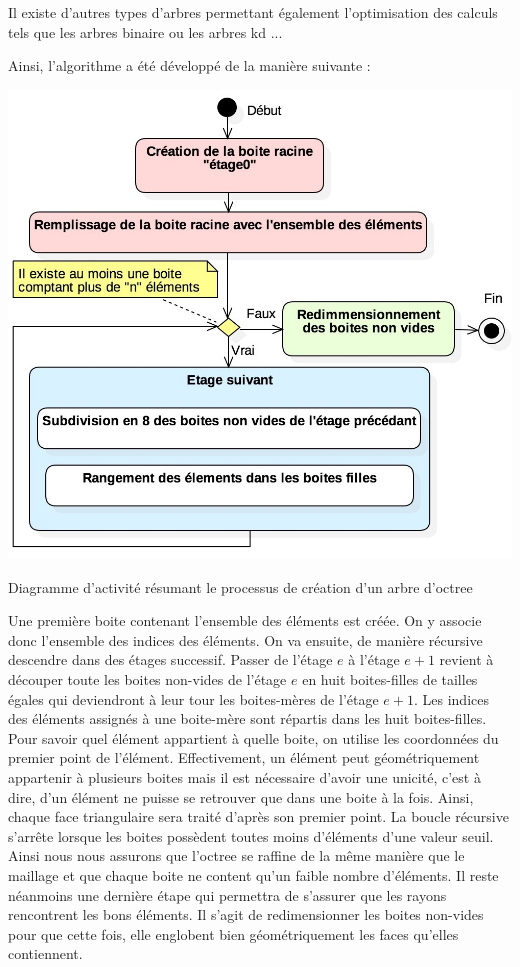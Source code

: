 Il existe d'autres types d'arbres permettant également l'optimisation des calculs tels que les arbres binaire ou les arbres kd ...

Ainsi, l'algorithme a été développé de la manière suivante :

\begin{figureth}
	\includegraphics[width=0.8\linewidth]{images/DiagOctree}
	\caption{Diagramme d'activité résumant le processus de création d'un arbre d'octree}
	\label{DiagOctree}
\end{figureth}

Une première boite contenant l'ensemble des éléments est créée. On y associe donc l'ensemble des indices des éléments. On va ensuite, de manière récursive descendre dans des étages successif. Passer de l'étage $e$ à l'étage $e+1$ revient à découper toute les boites non-vides de l'étage $e$ en huit boites-filles de tailles égales qui deviendront à leur tour les boites-mères de l'étage $e+1$. Les indices des éléments assignés à une boite-mère sont répartis dans les huit boites-filles. Pour savoir quel élément appartient à quelle boite, on utilise les coordonnées du premier point de l'élément. Effectivement, un élément peut géométriquement appartenir à plusieurs boites mais il est nécessaire d'avoir une unicité, c'est à dire, d'un élément ne puisse se retrouver que dans une boite à la fois. Ainsi, chaque face triangulaire sera traité d'après son premier point. La boucle récursive s'arrête lorsque les boites possèdent toutes moins d'éléments d'une valeur seuil. Ainsi nous nous assurons que l'octree se raffine de la même manière que le maillage et que chaque boite ne content qu'un faible nombre d'éléments.
Il reste néanmoins une dernière étape qui permettra de s'assurer que les rayons rencontrent les bons éléments. Il s'agit de redimensionner les boites non-vides pour que cette fois, elle englobent bien géométriquement les faces qu'elles contiennent.

